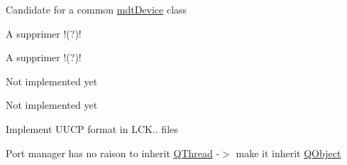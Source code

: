 \begin{DoxyRefList}
Candidate for a common \hyperlink{classmdt_device}{mdt\-Device} class  
\item[\label{todo__todo000009}%
\hypertarget{todo__todo000009}{}%
Class \hyperlink{classmdt_device_u3606_a_widget}{mdt\-Device\-U3606\-A\-Widget} ]A supprimer !(?)!  
\item[\label{todo__todo000008}%
\hypertarget{todo__todo000008}{}%
Member \hyperlink{classmdt_device_u3606_a_widget_a653d85749d67555d8c3a43a779b6d2a2}{mdt\-Device\-U3606\-A\-Widget\-:\-:mdt\-Device\-U3606\-A\-Widget} (\hyperlink{class_q_widget}{Q\-Widget} $\ast$parent=0)]A supprimer !(?)!  
\item[\label{todo__todo000096}%
\hypertarget{todo__todo000096}{}%
Member \hyperlink{classmdt_frame_codec_scpi_aa6596dc898438be704191ad282d02100}{mdt\-Frame\-Codec\-Scpi\-:\-:decode\-I\-E\-E\-Edata\-Ascii} (const Q\-Byte\-Array \&data)]Not implemented yet  
\item[\label{todo__todo000097}%
\hypertarget{todo__todo000097}{}%
Member \hyperlink{classmdt_frame_codec_scpi_ab70c6c3d2d91ddff065952b6c2db8345}{mdt\-Frame\-Codec\-Scpi\-:\-:decode\-I\-E\-E\-Edata\-Byte} (const Q\-Byte\-Array \&data)]Not implemented yet  
\item[\label{todo__todo000023}%
\hypertarget{todo__todo000023}{}%
Class \hyperlink{classmdt_port_lock}{mdt\-Port\-Lock} ]Implement U\-U\-C\-P format in L\-C\-K.. files  
\item[\label{todo__todo000030}%
\hypertarget{todo__todo000030}{}%
Class \hyperlink{classmdt_port_manager}{mdt\-Port\-Manager} ]Port manager has no raison to inherit \hyperlink{class_q_thread}{Q\-Thread} -\/$>$ make it inherit \hyperlink{class_q_object}{Q\-Object} 


\end{DoxyRefList}
